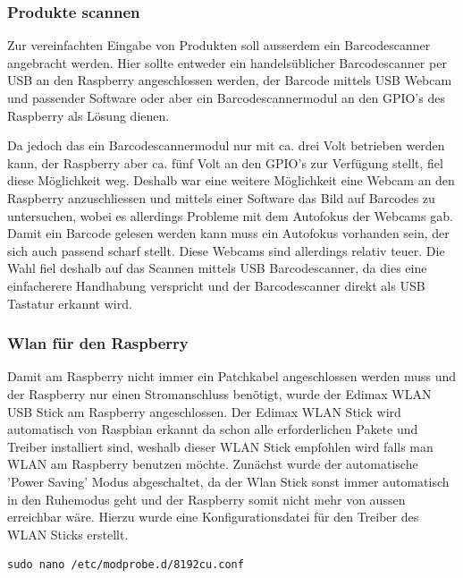 \documentclass[11pt,a4paper]{article} %
\begin{document}
\subsubsection{Produkte scannen}
Zur vereinfachten Eingabe von Produkten soll ausserdem ein Barcodescanner angebracht werden. Hier sollte entweder ein handelsüblicher Barcodescanner per USB an den Raspberry angeschlossen werden, der Barcode mittels USB Webcam und passender Software oder aber ein Barcodescannermodul an den GPIO's des Raspberry als Lösung dienen.
\par
 Da jedoch das ein Barcodescannermodul nur mit ca. drei Volt betrieben werden kann, der Raspberry aber ca. fünf Volt an den GPIO's zur Verfügung stellt, fiel diese Möglichkeit weg. Deshalb war eine weitere Möglichkeit eine Webcam an den Raspberry anzuschliessen und mittels einer Software das Bild auf Barcodes zu untersuchen, wobei es allerdings Probleme mit dem Autofokus der Webcams gab. Damit ein Barcode gelesen werden kann muss ein Autofokus vorhanden sein, der sich auch passend scharf stellt. Diese Webcams sind allerdings relativ teuer. Die Wahl fiel deshalb auf das Scannen mittels USB Barcodescanner, da dies eine einfacherere Handhabung verspricht und der Barcodescanner direkt als USB Tastatur erkannt wird.
\par
\subsubsection{Wlan für den Raspberry}
Damit am Raspberry nicht immer ein Patchkabel angeschlossen werden muss und der Raspberry nur einen Stromanschluss benötigt, wurde der Edimax WLAN USB Stick\cite{8} am Raspberry angeschlossen. Der Edimax WLAN Stick wird automatisch von Raspbian erkannt da schon alle erforderlichen Pakete und Treiber installiert sind, weshalb dieser WLAN Stick empfohlen wird falls man WLAN am Raspberry benutzen möchte. Zunächst wurde der automatische 'Power Saving' Modus abgeschaltet, da der Wlan Stick sonst immer automatisch in den Ruhemodus geht und der Raspberry somit nicht mehr von aussen erreichbar wäre.
\newpage
Hierzu wurde eine Konfigurationsdatei für den Treiber des WLAN Sticks erstellt.
\begin{frame}

\begin{lstlisting}
sudo nano /etc/modprobe.d/8192cu.conf
\end{lstlisting}

\end{frame}
\par
\end{document}
